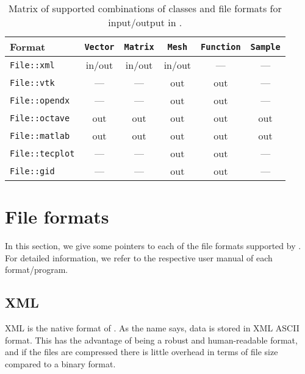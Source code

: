 \begin{table}[htbp]
  \begin{center}
    \begin{tabular}{|l||c|c|c|c|c|}
      \hline
      Format           & \texttt{Vector} & \texttt{Matrix} & \texttt{Mesh} & \texttt{Function} & \texttt{Sample} \\
      \hline
      \hline
      \texttt{File::xml}     & in/out & in/out & in/out & --- & --- \\
      \hline
      \texttt{File::vtk}     & ---    & ---    & out    & out & --- \\
      \hline
      \texttt{File::opendx}  & ---    & ---    & out    & out & --- \\
      \hline
      \texttt{File::octave}  & out    & out    & out    & out & out \\
      \hline
      \texttt{File::matlab}  & out    & out    & out    & out & out \\
      \hline
      \texttt{File::tecplot} & ---    & ---    & out    & out & ---  \\
      \hline
      \texttt{File::gid}     & ---    & ---    & out    & out & ---\\
      \hline
    \end{tabular}
    \caption{Matrix of supported combinations of classes and file
      formats for input/output in \dolfin{}.}
    \label{tab:classes,formats}
  \end{center}
\end{table}

\section{File formats}

In this section, we give some pointers to each of the file formats
supported by \dolfin{}. For detailed information, we refer to the
respective user manual of each format/program.


\subsection{\dolfin{} XML}

\dolfin{} XML is the native format of \dolfin{}. As the name says,
data is stored in XML ASCII format. This has the advantage of being a
robust and human-readable format, and if the files are compressed
there is little overhead in terms of file size compared to a binary
format.

